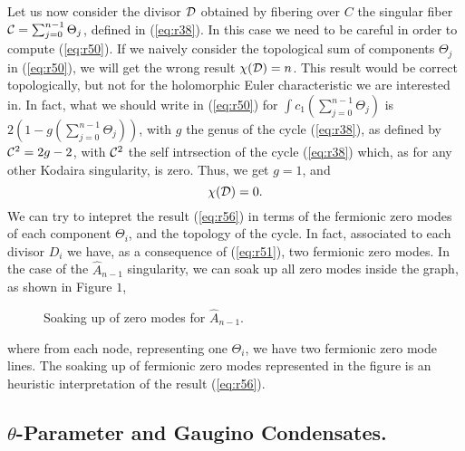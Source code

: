 Let us now consider the divisor ${\cal D}$ obtained by fibering over $C$ the 
singular fiber ${\cal C} = \sum_{j=0}^{n-1} \Theta_j$, defined in (\ref{eq:r38}). In 
this case we need to be careful in order to compute (\ref{eq:r50}). If we 
naively consider the topological sum of components $\Theta_j$ in (\ref{eq:r50}), 
we will get the wrong result $\chi({\cal D})=n$. This result would be correct 
topologically, but not for the holomorphic Euler characteristic we are 
interested in. In fact, what we should write in (\ref{eq:r50}) for 
$\int c_1(\sum_{j=0}^{n-1} \Theta_j)$ is $2(1-g(\sum_{j=0}^{n-1} \Theta_j))$, 
with $g$ the genus of the cycle (\ref{eq:r38}), as defined by 
${\cal C}^2=2g-2$, with ${\cal C}^2$ the self intrsection of the cycle (\ref{eq:r38}) 
which, as for any other Kodaira singularity, is zero. Thus, we get $g=1$, 
and \cite{Gomez} 
\begin{equation}
\chi({\cal D})=0.
\label{eq:r56}
\end{equation}
We can try to intepret the result (\ref{eq:r56}) in terms of the fermionic 
zero modes of each component $\Theta_i$, and the topology of the cycle. In fact, 
associated to each divisor $D_i$ we have, as a consequence of (\ref{eq:r51}), 
two fermionic zero modes. In the case of the $\hat{A}_{n-1}$ singularity, 
we can soak up all zero modes inside the graph, as shown in Figure $1$,




\begin{figure}[ht]
\def\epsfsize#1#2{.6#1}
\centerline{}
\caption{Soaking up of zero modes for $\hat{A}_{n-1}$.}
\end{figure}

 
where from each node, representing one $\Theta_i$, we have two 
fermionic zero mode lines. The soaking up of fermionic zero modes represented 
in the figure is an heuristic interpretation of the result (\ref{eq:r56}).
  

\subsection{$\theta$-Parameter and Gaugino Condensates.}

